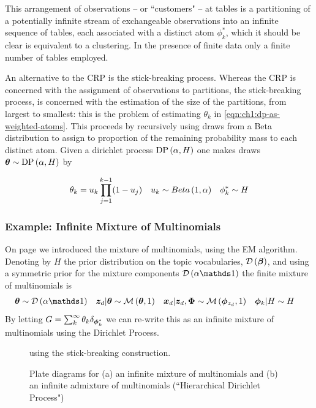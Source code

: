 This arrangement of observations -- or ``customers" --  at tables is a partitioning of a potentially infinite stream of exchangeable observations into an infinite sequence of tables, each associated with a distinct atom $\phi^*_k$, which it should be clear is equivalent to a clustering. In the presence of finite data only a finite number of tables employed.

An alternative to the CRP is the stick-breaking process\cite{Sethuraman1994}. Whereas the CRP is concerned with the assignment of observations to partitions, the stick-breaking process, is concerned with the estimation of the size of the partitions, from largest to smallest: this is the problem of estimating $\theta_k$ in \eqref{eqn:ch1:dp-as-weighted-atoms}. This proceeds by recursively using draws from a Beta distribution to assign to proportion of the remaining probability mass to each distinct atom. Given a dirichlet process $\text{DP} \left( {\alpha, H} \right)$ one makes draws $\bm \theta \sim \text{DP} \left( {\alpha, H} \right)$ by

\begin{align}
\theta_k & = u_k \prod_{j=1}^{k-1} (1 - u_j) &
u_k & \sim Beta \left( {1}, {\alpha} \right) &
\phi^*_k \sim H
\end{align}


\subsubsection*{Example: Infinite Mixture of Multinomials}
On page \pageref{sec:ch1:mom} we introduced the mixture of multinomials, using the EM algorithm. Denoting by $H$ the prior distribution on the topic vocabularies, $\mathcal{D} \left( {\bm \beta} \right)$, and using a symmetric prior for the mixture components $\dir{\alpha \one}$ the finite mixture of multinomials is
\begin{align}
\vv{\theta} & \sim \dir{\alpha \one} &
\zd|\vv{\theta} & \sim \muln{\vv{\theta}}{1} & 
\xd|\zd, \params & \sim \muln{\param_{z_{d}}}{1} & 
\param_k|H & \sim H
\end{align}
By letting $G = \sum_k^\infty \theta_k \delta_{\bm \phi^*_k}$ we can re-write this as an infinite mixture\cite{Antoniak1974} of multinomials using the Dirichlet Process.

\begin{figure}
\centering
    \subfigure[]{
        \resizebox{0.40\textwidth}{0.40\textwidth}{
            
        }
    }
    \subfigure[]{
        \resizebox{0.55\textwidth}{0.40\textwidth}{
            
        }
    }

    \caption{Plate diagrams for (a) an infinite mixture of multinomials and (b) an infinite admixture of multinomials (``Hierarchical Dirichlet Process")} using the stick-breaking construction.
\label{fig:inf-plates}
\end{figure}

